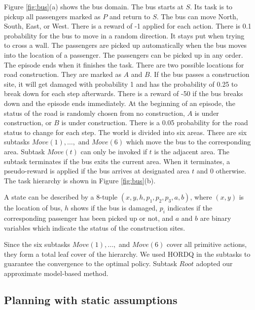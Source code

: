 Figure \ref{fig:bus}(a) shows the bus domain. The bus starts at $S$. Its task
is to pickup all passengers marked as $P$ and return to $S$.
The bus can move North, South, East, or West. There is a reward of -1 applied for each action.
There is 0.1 probability for the bus to move in a random direction. It stays put 
when trying to cross a wall. 
The passengers are picked up automatically when the bus moves into
the location of a passenger. The passengers can be picked up in any order.
The episode ends when it finishes the task.  
There are two possible locations for road construction. They are marked as 
$A$ and $B$. If the bus passes a construction site, it will get damaged with probability 1 and has the probability
of 0.25 to break down for each step afterwards. There is a reward of -50 if the bus breaks down and the episode ends immediately. 
At the beginning of an episode, the status of the road is randomly chosen from no construction, $A$ is under construction,
or $B$ is under construction. There is a 0.05 probability for the road status to change for each step.
The world is divided into six areas. There are six subtasks $Move(1), \dots,$ and $Move(6)$ which move the
bus to the corresponding area.
Subtask $Move(t)$ can only be invoked if $t$ is the adjacent area.
The subtask terminates if the bus exits the current area.
When it terminates, a pseudo-reward is applied if the bus arrives at designated area $t$ and 0 otherwise.
The task hierarchy is shown in Figure \ref{fig:bus}(b). 

A state can be described by a 8-tuple $(x, y, h, p_1, p_2, p_3, a, b)$, where $(x, y)$ is the location of 
bus, $h$ shows if the bus is damaged, $p_i$ indicates if the corresponding passenger has been picked up or not,
and $a$ and $b$ are binary variables which indicate the status of the construction sites.

Since the six subtasks $Move(1), \dots,$ and $Move(6)$ cover all primitive actions, they form a total leaf cover of the hierarchy.
We used HORDQ in the subtasks to guarantee the convergence to the optimal
policy. Subtask $Root$ adopted our approximate model-based method. 


\subsection{Planning with static assumptions}
\label{se:Model}

